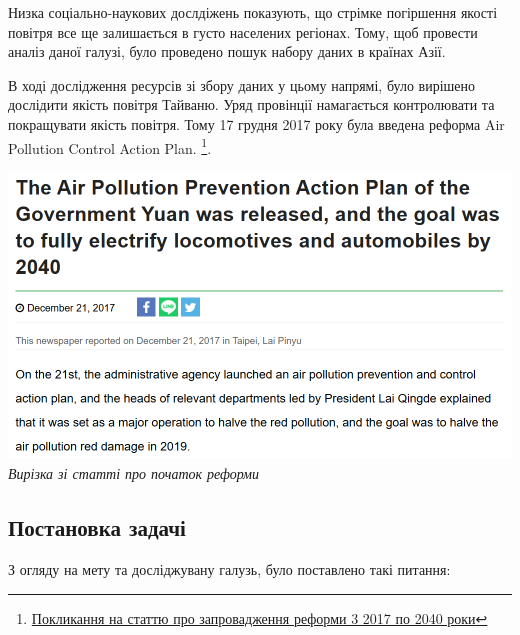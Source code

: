 \documentclass{article}
\begin{document}
Низка соціально-наукових дослдіжень показують, що стрімке погіршення якості повітря все ще залишається в густо населених регіонах. Тому, щоб провести аналіз даної галузі, було проведено пошук набору даних в країнах Азії. 

В ході дослідження ресурсів зі збору даних у цьому напрямі, було вирішено дослідити якість повітря Тайваню. Уряд провінції намагається контролювати та покращувати якість повітря. Тому 17 грудня 2017 року була введена  реформа Air Pollution Control Action Plan. \footnote{\href{https://e-info.org.tw/node/209138}{Покликання на статтю про запровадження реформи 3 2017 по 2040 роки}}.

\begin{center}
    \includegraphics[height=3in]{notes/media/air_quality_reform_news.png}\\
    \textit{Вирізка зі статті про початок реформи}
\end{center}

\subsection{Постановка задачі}
З огляду на мету та досліджувану галузь, було поставлено такі питання: 
\end{document}

